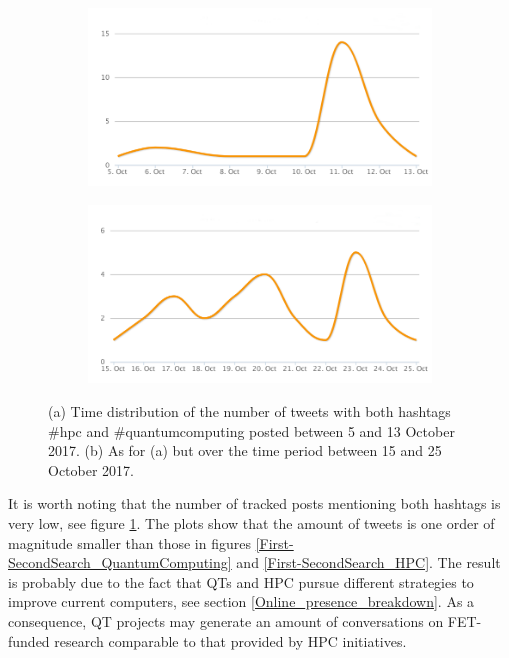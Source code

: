\begin{figure}
 \centering
 \begin{subfigure}[b]{0.95\textwidth}
   \includegraphics[width=1\linewidth]{Images/FirstSearch_HPC-QuantumComputing.png}
   \caption{} 
 \end{subfigure}

 \begin{subfigure}[b]{0.95\textwidth}
   \includegraphics[width=1\linewidth]{Images/SecondSearch_HPC-QuantumComputing.png}
   \caption{}
 \end{subfigure}
 \caption{(a) Time distribution of the number of tweets with both hashtags \#hpc and \#quantumcomputing posted between 5 and 13 October 2017. (b) As for (a) but over the time period between 15 and 25 October 2017.} 
 \label{First-SecondSearch_HPC-QuantumComputing}
\end{figure}

It is worth noting that the number of tracked posts mentioning both hashtags is very low, see figure \ref{First-SecondSearch_HPC-QuantumComputing}. The plots show that the amount of tweets is one order of magnitude smaller than those in figures \ref{First-SecondSearch_QuantumComputing} and \ref{First-SecondSearch_HPC}. The result is probably due to the fact that QTs and HPC pursue different strategies to improve current computers, see section \ref{Online_presence_breakdown}. As a consequence, QT projects may generate an amount of conversations on FET-funded research comparable to that provided by HPC initiatives. 

